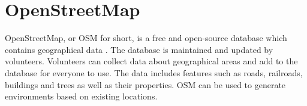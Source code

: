\section{OpenStreetMap}
    OpenStreetMap, or OSM for short, is a free and open-source database which contains geographical data \cite{open-street-map}. The database is maintained and updated by volunteers. Volunteers can collect data about geographical areas and add to the database for everyone to use. The data includes features such as roads, railroads, buildings and trees as well as their properties. OSM can be used to generate environments based on existing locations.
